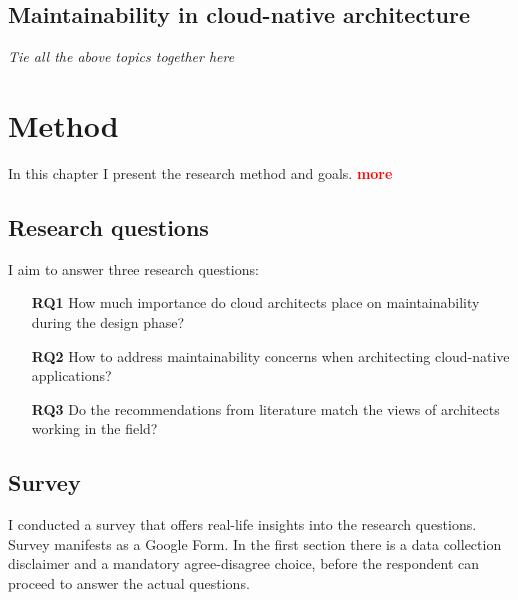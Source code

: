 \documentclass[utf8,english]{gradu3}
\newcommand{\todo}[1]{\textbf{\textcolor{red}{#1}}}
\newcommand{\tmp}[1]{\textit{{#1}}}
\begin{document}
\section{Maintainability in cloud-native architecture}
\tmp{Tie all the above topics together here}

\chapter{Method}
\label{chapter:method}

In this chapter I present the research method and goals. \todo{more}

\section{Research questions}

I aim to answer three research questions:
\begin{itemize}
  \item [\textbf{RQ1}] How much importance do cloud architects place on maintainability during
        the design phase?
  \item [\textbf{RQ2}] How to address maintainability concerns when architecting cloud-native
        applications?
  \item [\textbf{RQ3}] Do the recommendations from literature match the views of architects
        working in the field?
\end{itemize}


\section{Survey}

I conducted a survey that offers real-life insights into the research questions.
Survey manifests as a Google Form.
In the first section there is a data collection disclaimer and a mandatory agree-disagree choice,
before the respondent can proceed to answer the actual questions.
\end{document}
